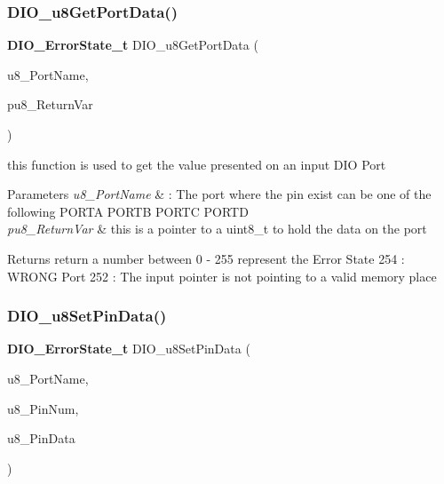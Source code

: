 \subsubsection{D\+I\+O\+\_\+u8\+Get\+Port\+Data()}
{\footnotesize\ttfamily \textbf{ D\+I\+O\+\_\+\+Error\+State\+\_\+t} D\+I\+O\+\_\+u8\+Get\+Port\+Data (\begin{DoxyParamCaption}\item[{\textbf{ D\+I\+O\+Port\+\_\+t}}]{u8\+\_\+\+Port\+Name,  }\item[{\textbf{ uint8\+\_\+t} $\ast$}]{pu8\+\_\+\+Return\+Var }\end{DoxyParamCaption})}



this function is used to get the value presented on an input D\+IO Port 


\begin{DoxyParams}{Parameters}
{\em u8\+\_\+\+Port\+Name} & \+: The port where the pin exist can be one of the following P\+O\+R\+TA P\+O\+R\+TB P\+O\+R\+TC P\+O\+R\+TD \\
\hline
{\em pu8\+\_\+\+Return\+Var} & this is a pointer to a uint8\+\_\+t to hold the data on the port \\
\hline
\end{DoxyParams}
\begin{DoxyReturn}{Returns}
return a number between 0 -\/ 255 represent the Error State 254 \+: W\+R\+O\+NG Port 252 \+: The input pointer is not pointing to a valid memory place 
\end{DoxyReturn}
\mbox{\label{_d_i_o__interface_8h_afd3ecd8f36ed8d5af71a1cc1e7951c57}} 
\subsubsection{D\+I\+O\+\_\+u8\+Set\+Pin\+Data()}
{\footnotesize\ttfamily \textbf{ D\+I\+O\+\_\+\+Error\+State\+\_\+t} D\+I\+O\+\_\+u8\+Set\+Pin\+Data (\begin{DoxyParamCaption}\item[{\textbf{ D\+I\+O\+Port\+\_\+t}}]{u8\+\_\+\+Port\+Name,  }\item[{\textbf{ D\+I\+O\+Pin\+\_\+t}}]{u8\+\_\+\+Pin\+Num,  }\item[{\textbf{ uint8\+\_\+t}}]{u8\+\_\+\+Pin\+Data }\end{DoxyParamCaption})}

